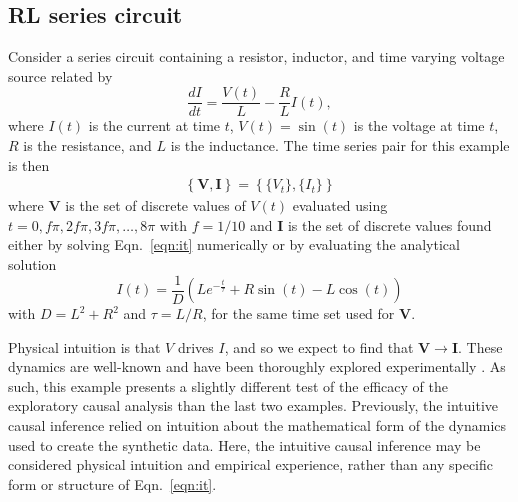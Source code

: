 \subsection{RL series circuit}
\label{sec:rlcirc}
Consider a series circuit containing a resistor, inductor, and time varying voltage source related by
\begin{equation}
\label{eqn:it}
\frac{dI}{dt} = \frac{V(t)}{L} - \frac{R}{L} I(t),
\end{equation}
where $I(t)$ is the current at time $t$, $V(t)= \sin\left(t\right)$ is the voltage at time $t$, $R$ is the resistance, and $L$ is the inductance.  The time series pair for this example is then 
\begin{eqnarray}
\label{eqn:RLcirceqn}
\left\{\mathbf{V},\mathbf{I}\right\} = \left\{\{V_t\},\{I_t\}\right\}
\end{eqnarray}
where $\mathbf{V}$ is the set of discrete values of $V(t)$ evaluated using $t=0,f\pi,2f\pi,3f\pi,\ldots,8\pi$ with $f=1/10$ and $\mathbf{I}$ is the set of discrete values found either by solving Eqn.\ \ref{eqn:it} numerically or by evaluating the analytical solution 
\begin{equation}
I(t) = \frac{1}{D}\left(Le^{-\frac{t}{\tau}}+R\sin(t)-L\cos(t)\right)
\end{equation}
with $D = L^2 + R^2$ and $\tau = L/R$, for the same time set used for $\mathbf{V}$.

Physical intuition is that $V$ drives $I$, and so we expect to find that $\mathbf{V}\rightarrow\mathbf{I}$.  These dynamics are well-known and have been thoroughly explored experimentally \cite{Halliday2010,Knight2012}.  As such, this example presents a slightly different test of the efficacy of the exploratory causal analysis than the last two examples.  Previously, the intuitive causal inference relied on intuition about the mathematical form of the dynamics used to create the synthetic data.  Here, the intuitive causal inference may be considered physical intuition and empirical experience, rather than any specific form or structure of Eqn.\ \ref{eqn:it}.    

